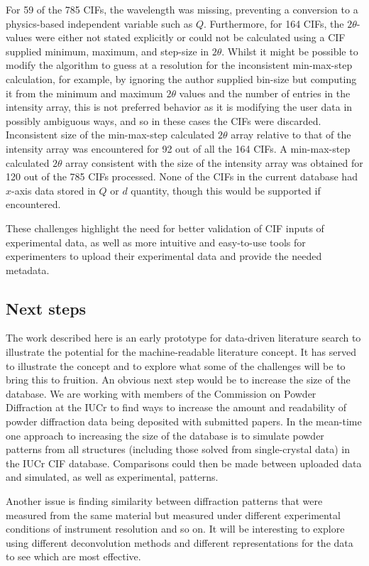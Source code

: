 \documentclass[preprint]{iucr}
\begin{document}
For 59 of the 785 CIFs, the wavelength was missing, preventing a conversion to a physics-based independent variable such as $Q$. Furthermore, for 164 CIFs, the $2\theta$-values were either not stated explicitly or could not be calculated using a CIF supplied minimum, maximum, and step-size in $2\theta$.
Whilst it might be possible to modify the algorithm to guess at a resolution for the inconsistent min-max-step calculation, for example, by ignoring the author supplied bin-size but computing it from the minimum and maximum $2\theta$ values and the number of entries in the intensity array, this is not preferred behavior as it is modifying the user data in possibly ambiguous ways, and so in these cases the CIFs were discarded.
Inconsistent size of the min-max-step calculated $2\theta$ array relative to that of the intensity array was encountered for 92 out of all the 164 CIFs. A min-max-step calculated $2\theta$ array consistent with the size of the intensity array was obtained for 120 out of the 785 CIFs processed. None of the CIFs in the current database had $x$-axis data stored in $Q$ or $d$ quantity, though this would be supported if encountered.


These challenges highlight the need for better validation of CIF inputs of experimental data, as well as more intuitive and easy-to-use tools for experimenters to upload their experimental data and provide the needed metadata.

\subsection{Next steps}


The work described here is an early prototype for data-driven literature search to illustrate the potential for the machine-readable literature concept. It has served to illustrate the concept and to explore what some of the challenges will be to bring this to fruition.  An obvious next step would be to increase the size of the database. We are working with members of the Commission on Powder Diffraction at the IUCr to find ways to increase the amount and readability of powder diffraction data being deposited with submitted papers. In the mean-time one approach to increasing the size of the database is to simulate powder patterns from all structures (including those solved from single-crystal data) in the IUCr CIF database. Comparisons could then be made between uploaded data and simulated, as well as experimental, patterns. 

Another issue is finding similarity between diffraction patterns that were measured from the same material but measured under different experimental conditions of instrument resolution and so on.  It will be interesting to explore using different deconvolution methods and different representations for the data to see which are most effective.
\end{document}
